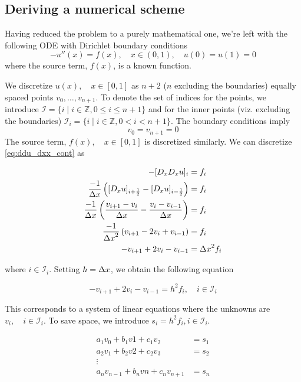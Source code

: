 \documentclass[a4paper]{article}
\begin{document}
\subsection{Deriving a numerical scheme}
Having reduced the problem to a purely mathematical one, we're left with the following ODE with Dirichlet boundary conditions
\begin{equation}
    -u''(x) = f(x), \quad x\in(0,1), \quad u(0) = u(1) = 0
    \label{eq:ddu_dxx_cont}
\end{equation}
where the source term, $f(x)$, is a known function.


We discretize $u(x), \quad x \in [0, 1]$ as $n+2$ ($n$ excluding the boundaries) equally spaced points $v_0, \dots, v_{n+1}$. To denote the set of indices for the points, we introduce $\mathcal{I} = \{ i \mid i \in \mathbb{Z}, 0 \leq i \leq n + 1\}$ and for the inner points (viz. excluding the boundaries) $\mathcal{I}_i = \{ i \mid i \in \mathbb{Z}, 0 < i < n + 1\}$.
The boundary conditions imply
\begin{equation}
v_0 = v_{n+1} = 0
\label{eq:boundaries_disc}
\end{equation}
The source term, $f(x), \quad x \in [0, 1]$ is discretized similarly. We can discretize \eqref{eq:ddu_dxx_cont} as

\begin{align*}
-[D_x D_x u]_i &= f_i \\
\frac{-1}{{\Delta x}} \left( [D_x u]_{i+\frac{1}{2}} - [D_x u]_{i-\frac{1}{2}} \right) &= f_i \\
\frac{-1}{{\Delta x}} \left( \frac{v_{i+1} - v_{i}}{{\Delta x}} - \frac{v_{i} - v_{i-1}}{{\Delta x}} \right) &= f_i \\
\frac{-1}{{\Delta x}^2} \left( v_{i+1} - 2v_{i} + v_{i-1} \right) &= f_i \\
-v_{i+1} + 2v_{i} - v_{i-1}  &= {\Delta x}^2 f_i
\end{align*}

where $i \in \mathcal{I}_i$. Setting $h = {\Delta x}$, we obtain the following equation

\begin{equation}
-v_{i+1} + 2v_{i} - v_{i-1}  = h^2 f_i, \quad i \in \mathcal{I}_i
\label{ddu_dxx_disc}
\end{equation}

This corresponds to a system of linear equations where the unknowns are $v_i, \quad i \in \mathcal{I}_i$. To save space, we introduce $s_i = h^2 f_i, i \in \mathcal{I}_i$.

\begin{equation}
    \begin{array}{cccc}
        a_1 v_{0} + b_1 v{1} + c_1 v_{2} &= s_1 \\
        a_2 v_{1} + b_2 v{2} + c_2 v_{3} &= s_2 \\
        \vdots \\
        a_n v_{n-1} + b_n v{n} + c_n v_{n+1} &= s_n \\
    \end{array}
\end{equation}
\end{document}

